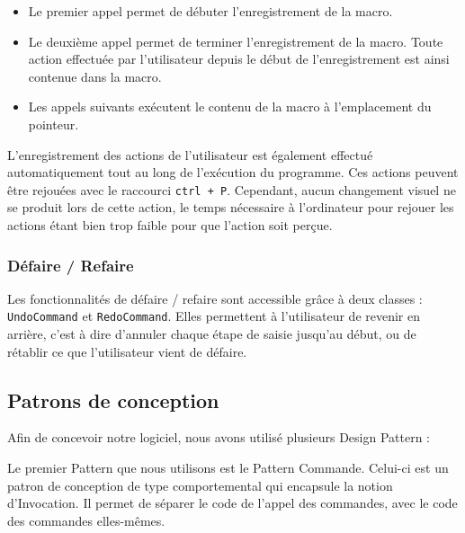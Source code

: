 \documentclass[a4paper]{article}
\begin{document}
			\begin{itemize}
				\item Le premier appel permet de débuter l’enregistrement de la macro.

				\item Le deuxième appel permet de terminer l’enregistrement de la macro. Toute action effectuée par l’utilisateur depuis le début de l’enregistrement est ainsi contenue dans la macro.

				\item Les appels suivants exécutent le contenu de la macro à l’emplacement du pointeur.
			\end{itemize}

			L’enregistrement des actions de l’utilisateur est également effectué automatiquement tout au long de l’exécution du programme. Ces actions peuvent être rejouées avec le raccourci \texttt{ctrl + P}. Cependant, aucun changement visuel ne se produit lors de cette action, le temps nécessaire à l’ordinateur pour rejouer les actions étant bien trop faible pour que l’action soit perçue.

			\subsubsection{Défaire / Refaire}

			Les fonctionnalités de défaire / refaire sont accessible grâce à deux classes : \texttt{UndoCommand} et \texttt{RedoCommand}. Elles permettent à l'utilisateur de revenir en arrière, c'est à dire d'annuler chaque étape de saisie jusqu'au début, ou de rétablir ce que l'utilisateur vient de défaire.

		\vspace{0.5cm}

		\subsection{Patrons de conception}

		\vspace{0.5cm}

		Afin de concevoir notre logiciel, nous avons utilisé plusieurs Design Pattern :

		\vspace{0.5cm}

		Le premier Pattern que nous utilisons est le Pattern Commande. Celui-ci est un patron de conception de type comportemental qui encapsule la notion d'Invocation. Il permet de séparer le code de l'appel des commandes, avec le code des commandes elles-mêmes.
\end{document}
